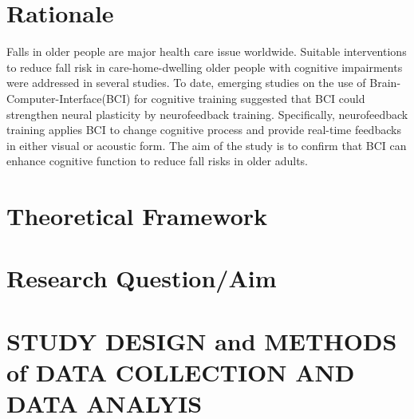 \documentclass{article}
\begin{document}
\section{Rationale}
\begin{comment}
Aim: To explain why the research questions/aim(s) being addressed are important and why closely related questions are not being covered. 
This should include:
•	A clear explanation of the research question/aim(s) and the justification of the study i.e. why the question is worth asking and, through consultation with public and patient groups, why this is worthwhile to participants or wider service delivery.
•	A contextual framing of the research question/aim(s) in relation to relevant policy and historical and/or literature bases.
\end{comment}

Falls in older people are major health care issue worldwide. Suitable interventions to reduce fall risk in care-home-dwelling older people with cognitive impairments were addressed in several studies. To date, emerging studies on the use of Brain-Computer-Interface(BCI) for cognitive training suggested that BCI could strengthen neural plasticity by neurofeedback training. Specifically, neurofeedback training applies BCI to change cognitive process and provide real-time feedbacks in either visual or acoustic form. The aim of the study is to confirm that BCI can enhance cognitive function to reduce fall risks in older adults. 

\section{Theoretical Framework}


\section{Research Question/Aim}


\section{STUDY DESIGN and METHODS of DATA COLLECTION AND DATA ANALYIS}



\printbibliography
\end{document}
